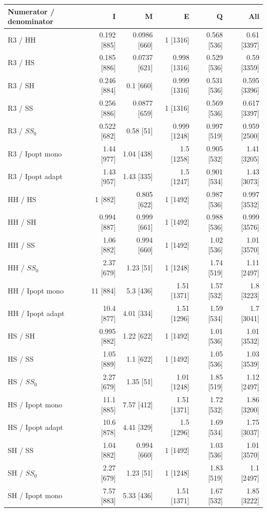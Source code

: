 \begin{tabular}{@{}lrrrrr@{}}
\toprule
Numerator / denominator & I & M & E & Q & All \\
\midrule
R3 / HH & 0.192 [885] & 0.0986 [660] & 1 [1316] & 0.568 [536] & 0.61 [3397] \\
R3 / HS & 0.185 [886] & 0.0737 [621] & 0.998 [1316] & 0.529 [536] & 0.59 [3359] \\
R3 / SH & 0.246 [884] & 0.1 [660] & 0.999 [1316] & 0.531 [536] & 0.595 [3396] \\
R3 / SS & 0.256 [886] & 0.0877 [659] & 1 [1316] & 0.569 [536] & 0.617 [3397] \\
R3 / $SS_0$ & 0.522 [682] & 0.58 [51] & 0.999 [1248] & 0.997 [519] & 0.959 [2500] \\
R3 / Ipopt mono & 1.44 [977] & 1.04 [438] & 1.5 [1258] & 0.905 [532] & 1.41 [3205] \\
R3 / Ipopt adapt & 1.43 [957] & 1.43 [335] & 1.5 [1247] & 0.901 [534] & 1.43 [3073] \\
HH / HS & 1 [882] & 0.805 [622] & 1 [1492] & 0.987 [536] & 0.997 [3532] \\
HH / SH & 0.994 [887] & 0.999 [661] & 1 [1492] & 0.988 [536] & 0.999 [3576] \\
HH / SS & 1.06 [882] & 0.994 [660] & 1 [1492] & 1.02 [536] & 1.01 [3570] \\
HH / $SS_0$ & 2.37 [679] & 1.23 [51] & 1 [1248] & 1.74 [519] & 1.11 [2497] \\
HH / Ipopt mono & 11 [884] & 5.3 [436] & 1.51 [1371] & 1.57 [532] & 1.8 [3223] \\
HH / Ipopt adapt & 10.4 [877] & 4.01 [334] & 1.51 [1296] & 1.59 [534] & 1.7 [3041] \\
HS / SH & 0.995 [882] & 1.22 [622] & 1 [1492] & 1.01 [536] & 1.01 [3532] \\
HS / SS & 1.05 [889] & 1.1 [622] & 1 [1492] & 1.05 [536] & 1.03 [3539] \\
HS / $SS_0$ & 2.27 [679] & 1.35 [51] & 1.01 [1248] & 1.85 [519] & 1.12 [2497] \\
HS / Ipopt mono & 11.1 [885] & 7.57 [412] & 1.51 [1371] & 1.72 [532] & 1.86 [3200] \\
HS / Ipopt adapt & 10.6 [878] & 4.41 [329] & 1.5 [1296] & 1.69 [534] & 1.75 [3037] \\
SH / SS & 1.04 [882] & 0.994 [660] & 1 [1492] & 1.03 [536] & 1.01 [3570] \\
SH / $SS_0$ & 2.27 [679] & 1.23 [51] & 1 [1248] & 1.83 [519] & 1.1 [2497] \\
SH / Ipopt mono & 7.57 [883] & 5.33 [436] & 1.51 [1371] & 1.67 [532] & 1.85 [3222] \\

\end{tabular}

